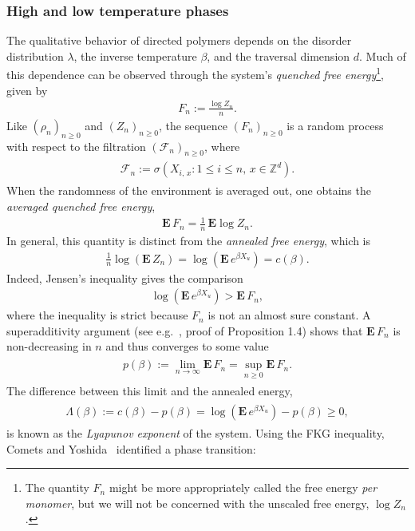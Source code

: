 \documentclass[11pt,reqno]{amsart}
\numberwithin{equation}{section}
\theoremstyle{definition}
\begin{document}
\subsubsection{High and low temperature phases}
The qualitative behavior of directed polymers depends on the disorder distribution $\lambda$, the inverse temperature $\beta$, and the traversal dimension $d$.
Much of this dependence can be observed through the system's \textit{quenched free energy}\footnote{The quantity $F_n$ might be more appropriately called the free energy \textit{per monomer}, but we will not be concerned with the unscaled free energy, $\log Z_n$.}, given by
{\begin{align*} {
F_n := \frac{\log Z_n}{n}.
} \end{align*}}
Like $(\rho_n)_{n \geq 0}$ and $(Z_n)_{n \geq 0}$, the sequence $(F_n)_{n \geq 0}$ is a random process with respect to the filtration $({\mathcal{F}}_n)_{n \geq 0}$, where
{\begin{align} \begin{split} {
{\mathcal{F}}_n := \sigma(X_{i,\,x} : 1 \leq i \leq n,\, x \in {\mathbb{Z}}^d).\label{gndef}
} \end{split} \end{align}}
When the randomness of the environment is averaged out, one obtains the \textit{averaged quenched free energy},
{\begin{align*} {
{\mathbf{E}}\, F_n = \frac{1}{n}\, {\mathbf{E}} \log Z_n.
} \end{align*}}
In general, this quantity is distinct from the \textit{annealed free energy}, which is
{\begin{align*} {
\frac{1}{n} \log ({\mathbf{E}}\, Z_n) = \log({\mathbf{E}}\, e^{\beta X_u}) = c(\beta).
} \end{align*}}
Indeed, Jensen's inequality 
gives the comparison
{\begin{align*} {
\log({\mathbf{E}}\, e^{\beta X_u}) > {\mathbf{E}}\, F_n,
} \end{align*}}
where the inequality is strict because $F_n$ is not an almost sure constant.
A superadditivity argument  (see e.g.~\cite{carmona-hu02}, proof of Proposition 1.4) 
shows that ${\mathbf{E}}\, F_n$ is non-decreasing in $n$
and thus converges to some value
{\begin{align} \begin{split} {
p(\beta) := \lim_{n \to \infty} {\mathbf{E}}\, F_n = \sup_{n \geq 0} {\mathbf{E}}\, F_n. \label{avgFn_lim}
} \end{split} \end{align}}
The difference between this limit and the annealed energy,
{\begin{align} \begin{split} {
\Lambda(\beta) := c(\beta) - p(\beta) = \log({\mathbf{E}}\, e^{\beta X_u}) - p(\beta) \geq 0, \label{lyapunov_def}
} \end{split} \end{align}}
is known as the \textit{Lyapunov exponent} of the system.
Using the FKG inequality, Comets and Yoshida~\cite{comets-yoshida06} identified a phase transition:
\end{document}
